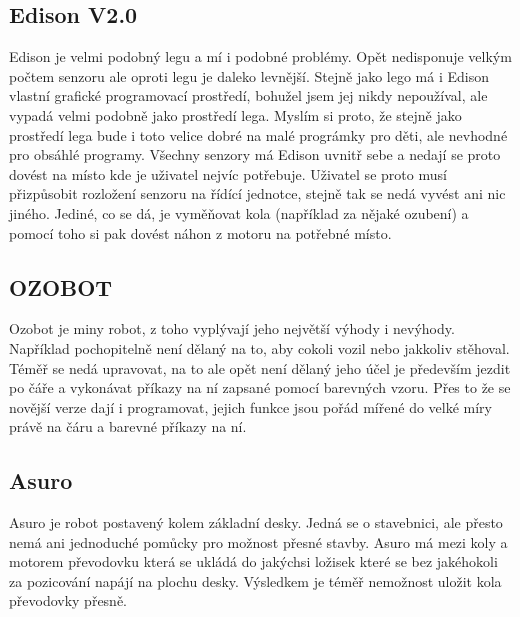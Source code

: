 \documentclass{template/socthesis}
\begin{document}
\subsection{Edison V2.0}
Edison je velmi podobný legu a mí i podobné problémy. Opět nedisponuje velkým počtem senzoru ale oproti legu je daleko levnější. Stejně jako lego má i Edison vlastní grafické programovací prostředí, bohužel jsem jej nikdy nepoužíval, ale vypadá velmi podobně jako prostředí lega. Myslím si proto, že stejně jako prostředí lega bude i toto velice dobré na malé prográmky pro děti, ale nevhodné pro obsáhlé programy.
Všechny senzory má Edison uvnitř sebe a nedají se proto dovést na místo kde je uživatel nejvíc potřebuje. Uživatel se proto musí přizpůsobit rozložení senzoru na řídící jednotce, stejně tak se nedá vyvést ani nic jiného. Jediné, co se dá, je vyměňovat kola (například za nějaké ozubení) a pomocí toho si pak dovést náhon z motoru na potřebné místo.

\subsection{OZOBOT}
Ozobot je miny robot, z toho vyplývají jeho největší výhody i nevýhody. Například pochopitelně není dělaný na to, aby cokoli vozil nebo jakkoliv stěhoval. Téměř se nedá upravovat, na to ale opět není dělaný jeho účel je především jezdit po čáře a vykonávat příkazy na ní zapsané pomocí barevných vzoru. Přes to že se novější verze dají i programovat, jejich funkce jsou pořád mířené do velké míry právě na čáru a barevné příkazy na ní.

\subsection{Asuro}
Asuro je robot postavený kolem základní desky. Jedná se o stavebnici, ale přesto nemá ani jednoduché pomůcky pro možnost přesné stavby. Asuro má mezi koly a motorem převodovku která se ukládá do jakýchsi ložisek které se bez jakéhokoli za pozicování napájí na plochu desky. Výsledkem je téměř nemožnost uložit kola převodovky přesně.
\end{document}
